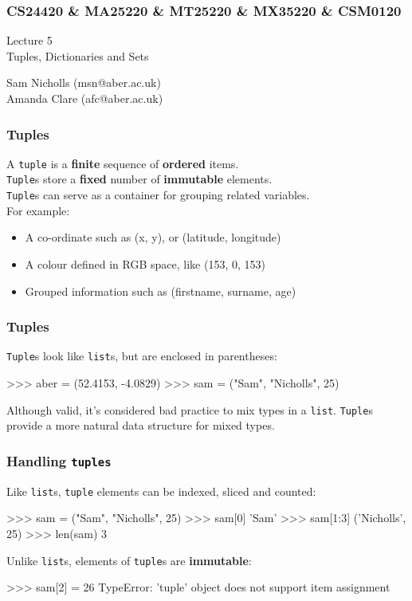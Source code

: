 \documentclass{beamer}
\begin{document}



\begin{frame}
\frametitle{CS24420 \& MA25220 \& MT25220 \& MX35220 \& CSM0120}

\begin{center}
\begin{huge}
Lecture 5\\
\bigskip
Tuples, Dictionaries and Sets
\end{huge}
\bigskip

Sam Nicholls (msn@aber.ac.uk)\\
Amanda Clare (afc@aber.ac.uk)

\end{center}
\end{frame}

\begin{frame}[fragile]
\frametitle{Tuples}
    A \texttt{tuple} is a \textbf{finite} sequence of \textbf{ordered} items.\\
    \texttt{Tuple}s store a \textbf{fixed} number of \textbf{immutable} elements.\\
    \texttt{Tuple}s can serve as a container for grouping related variables.
    \\For example:

    \begin{itemize}
        \item A co-ordinate such as (x, y), or (latitude, longitude)
        \item A colour defined in RGB space, like {\color{purple}(153, 0, 153)}
        \item Grouped information such as (firstname, surname, age)
    \end{itemize}
\end{frame}

\begin{frame}[fragile]
\frametitle{Tuples}
    \texttt{Tuple}s look like \texttt{list}s, but are enclosed in parentheses:
\begin{code}
>>> aber = (52.4153, -4.0829)
>>> sam = ("Sam", "Nicholls", 25)
\end{code}
Although valid, it's considered bad practice to mix types in a \texttt{list}.
\texttt{Tuple}s provide a more natural data structure for mixed types.
\end{frame}


\begin{frame}[fragile]
\frametitle{Handling \texttt{tuples}}
    Like \texttt{list}s, \texttt{tuple} elements can be indexed, sliced and counted:
\begin{code}
>>> sam = ("Sam", "Nicholls", 25)
>>> sam[0]
'Sam'
>>> sam[1:3]
('Nicholls', 25)
>>> len(sam)
3
\end{code}

\vskip 0.3cm
Unlike \texttt{list}s, elements of \texttt{tuple}s are \textbf{immutable}:
\begin{code}
>>> sam[2] = 26
TypeError: 'tuple' object does not support
           item assignment
\end{code}
\end{frame}
\end{document}
